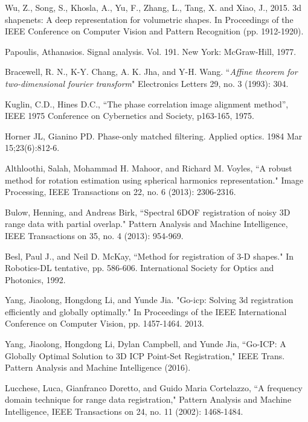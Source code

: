 \documentclass{UCF_ETD}
\begin{document}
\begin{thebibliography}{99}
Wu, Z., Song, S., Khosla, A., Yu, F., Zhang, L., Tang, X. and Xiao, J., 2015. 3d shapenets: A deep representation for volumetric shapes. In Proceedings of the IEEE Conference on Computer Vision and Pattern Recognition (pp. 1912-1920).


Papoulis, Athanasios. Signal analysis. Vol. 191. New York: McGraw-Hill, 1977.

Bracewell, R. N., K-Y. Chang, A. K. Jha, and Y-H. Wang. ``\emph{Affine theorem for two-dimensional fourier transform}" Electronics Letters 29, no. 3 (1993): 304.

Kuglin, C.D., Hines D.C., ``The phase correlation image alignment method”, IEEE 1975 Conference on Cybernetics and Society, p163-165, 1975.

Horner JL, Gianino PD. Phase-only matched filtering. Applied optics. 1984 Mar 15;23(6):812-6.




Althloothi, Salah, Mohammad H. Mahoor, and Richard M. Voyles, ``A robust method for rotation estimation using spherical harmonics representation." Image Processing, IEEE Transactions on 22, no. 6 (2013): 2306-2316.

Bulow, Henning, and Andreas Birk, ``Spectral 6DOF registration of noisy 3D range data with partial overlap." Pattern Analysis and Machine Intelligence, IEEE Transactions on 35, no. 4 (2013): 954-969.

Besl, Paul J., and Neil D. McKay, ``Method for registration of 3-D shapes." In Robotics-DL tentative, pp. 586-606. International Society for Optics and Photonics, 1992.

Yang, Jiaolong, Hongdong Li, and Yunde Jia. "Go-icp: Solving 3d registration efficiently and globally optimally." In Proceedings of the IEEE International Conference on Computer Vision, pp. 1457-1464. 2013.

Yang, Jiaolong, Hongdong Li, Dylan Campbell, and Yunde Jia, ``Go-ICP: A Globally Optimal Solution to
3D ICP Point-Set Registration," IEEE Trans. Pattern Analysis and Machine Intelligence (2016).


Lucchese, Luca, Gianfranco Doretto, and Guido Maria Cortelazzo, ``A frequency domain technique for range data registration," Pattern Analysis and Machine Intelligence, IEEE Transactions on 24, no. 11 (2002): 1468-1484.


\end{thebibliography}
\end{document}
